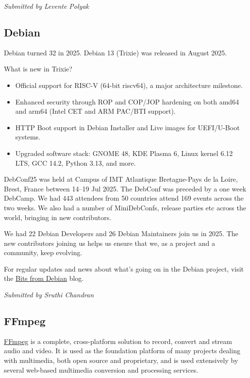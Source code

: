 \documentclass[a4paper]{report}
\begin{document}
{\em Submitted by Levente Polyak}

\subsection{Debian}

Debian turned 32 in 2025. Debian 13 (Trixie) was released in August 2025.

What is new in Trixie?

\begin{itemize}
\item Official support for RISC-V (64-bit riscv64), a major architecture milestone.
\item Enhanced security through ROP and COP/JOP hardening on both amd64 and arm64 (Intel CET and ARM PAC/BTI support).
\item HTTP Boot support in Debian Installer and Live images for UEFI/U-Boot systems.
\item Upgraded software stack: GNOME 48, KDE Plasma 6, Linux kernel 6.12 LTS, GCC 14.2, Python 3.13, and more.
\end{itemize}

DebConf25 was held at Campus of IMT Atlantique Bretagne-Pays de la Loire, Brest, France between 14--19 Jul 2025. The DebConf was preceded by a one week DebCamp. We had 443 attendees from 50 countries attend 169 events across the two weeks. We also had a number of MiniDebConfs, release parties etc across the world, bringing in new contributors.

We had 22 Debian Developers and 26 Debian Maintainers join us in 2025. The new contributors joining us helps us ensure that we, as a project and a community, keep evolving.

For regular updates and news about what's going on in the Debian project, visit the \href{https://bits.debian.org/}{Bits from Debian} blog.

{\em Submitted by Sruthi Chandran}

\subsection{FFmpeg}

\href{https://ffmpeg.org}{FFmpeg} is a complete, cross-platform solution to record, convert and stream audio and video. It is used as the foundation platform of many projects dealing with multimedia, both open source and proprietary, and is used extensively by several web-based multimedia conversion and processing services.
\end{document}
